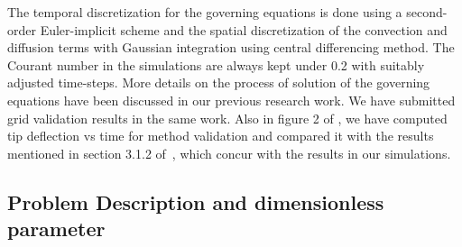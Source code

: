 \documentclass[final,3p,times,authoryear]{elsarticle}
\begin{document}
	
	The temporal discretization for the governing equations is done using a second-order Euler-implicit scheme and the spatial discretization of the convection and diffusion terms with Gaussian integration using central differencing method. The Courant number in the simulations are always kept under 0.2 with suitably adjusted time-steps. More details on the process of solution of the governing equations have been discussed in our previous research work\citep{Self2019}.
	We have submitted grid validation results in the same work. Also in figure 2 of \citep{Self2019}, we have computed tip deflection vs time for method validation and compared it with the results mentioned in section 3.1.2 of~\citep{Gluck2001}, which concur with the results in our simulations. 
		
	
	\subsection{Problem Description and dimensionless parameter}
	
\end{document}
